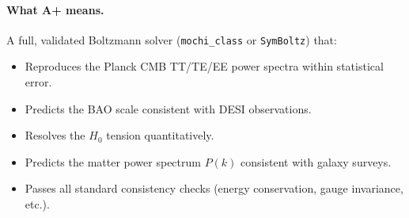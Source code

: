 \documentclass[11pt,a4paper]{article}
\begin{document}
\paragraph{What A+ means.}
A full, validated Boltzmann solver (\texttt{mochi\_class} or \texttt{SymBoltz}) that:
\begin{itemize}
    \item Reproduces the Planck CMB TT/TE/EE power spectra within statistical error.
    \item Predicts the BAO scale consistent with DESI observations.
    \item Resolves the $H_0$ tension quantitatively.
    \item Predicts the matter power spectrum $P(k)$ consistent with galaxy surveys.
    \item Passes all standard consistency checks (energy conservation, gauge invariance, etc.).
\end{itemize}
\end{document}
